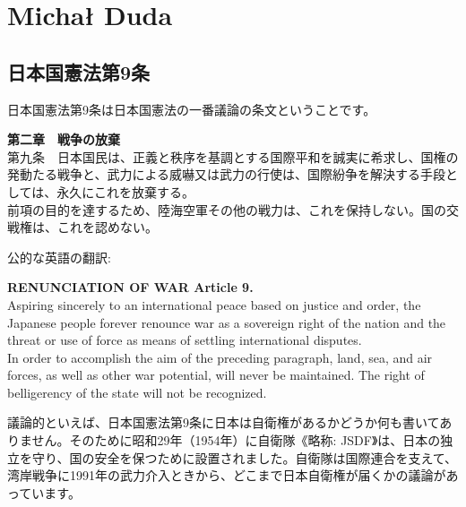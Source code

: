
\newpage
\section{Michał Duda}
\label{sec:dudmich}


\begin{CJK}{UTF8}{min}

\subsection{日本国憲法第9条}
日本国憲法第9条は日本国憲法の一番議論の条文ということです。

\begin{framed}
\textbf{第二章　戦争の放棄}\\
第九条　日本国民は、正義と秩序を基調とする国際平和を誠実に希求し、国権の発動たる戦争と、武力による威嚇又は武力の行使は、国際紛争を解決する手段としては、永久にこれを放棄する。\\
前項の目的を達するため、陸海空軍その他の戦力は、これを保持しない。国の交戦権は、これを認めない。
\end{framed}

公的な英語の翻訳:

\begin{framed}
\textbf{RENUNCIATION OF WAR Article 9.}\\
Aspiring sincerely to an international peace based on justice and order, the Japanese people forever renounce war as a sovereign right of the nation and the threat or use of force as means of settling international disputes.\\
In order to accomplish the aim of the preceding paragraph, land, sea, and air forces, as well as other war potential, will never be maintained. The right of belligerency of the state will not be recognized.
\end{framed}

議論的といえば、日本国憲法第9条に日本は自衛権があるかどうか何も書いてありません。そのために昭和29年（1954年）に自衛隊《略称: JSDF》は、日本の独立を守り、国の安全を保つために設置されました。自衛隊は国際連合を支えて、湾岸戦争に1991年の武力介入ときから、どこまで日本自衛権が届くかの議論があっています。
\end{CJK}

\newpage
